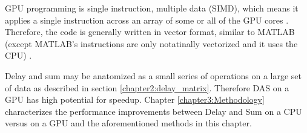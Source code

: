     GPU programming is single instruction, multiple data (SIMD), which means it applies a single instruction across an array of some or all of the GPU cores \cite{cardosoChapterHighperformanceEmbedded2017}. Therefore, the code is generally written in vector format, similar to MATLAB (except MATLAB's instructions are only notatinally vectorized and it uses the CPU) \cite{VectorizationMATLABSimulink}.

    Delay and sum may be anatomized as a small series of operations on a large set of data as described in section \ref{chapter2:delay_matrix}. Therefore DAS on a GPU has high potential for speedup. Chapter \ref{chapter3:Methodology} characterizes the performance improvements between Delay and Sum on a CPU versus on a GPU and the aforementioned methods in this chapter.